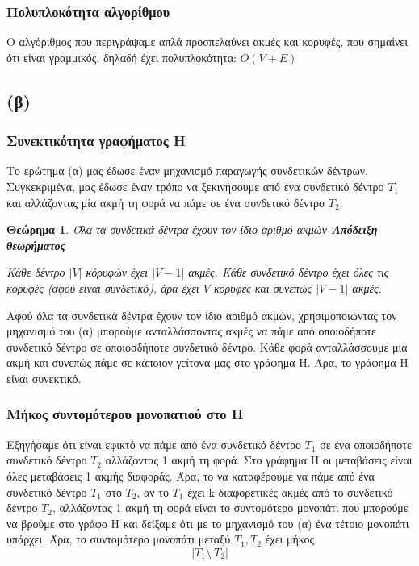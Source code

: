 \documentclass[a4paper,oneside, 11pt]{article}
\newtheorem{theorem}{Θεώρημα}
\begin{document}
\subsubsection{Πολυπλοκότητα αλγορίθμου}
Ο αλγόριθμος που περιγράψαμε απλά προσπελαύνει ακμές και κορυφές, που σημαίνει ότι είναι γραμμικός, δηλαδή έχει πολυπλοκότητα: $O(V+E)$

\subsection{(β)}
\subsubsection{Συνεκτικότητα γραφήματος H}
Το ερώτημα (α) μας έδωσε έναν μηχανισμό παραγωγής συνδετικών δέντρων. Συγκεκριμένα, μας έδωσε έναν τρόπο να ξεκινήσουμε από ένα συνδετικό δέντρο $T_1$ και αλλάζοντας μία ακμή τη φορά να πάμε σε ένα συνδετικό δέντρο $T_2$. \bigbreak 

\begin{theorem}{Όλα τα συνδετικά δέντρα έχουν τον ίδιο αριθμό ακμών}
\bigbreak 
\textbf{Απόδειξη θεωρήματος} \par 
Κάθε δέντρο $|V|$ κόρυφών έχει $|V-1|$ ακμές. Κάθε συνδετικό δέντρο έχει όλες τις κορυφές (αφού είναι συνδετικό), άρα έχει $V$ κορυφές και συνεπώς $|V-1|$ ακμές.
\end{theorem}

Αφού όλα τα συνδετικά δέντρα έχουν τον ίδιο αριθμό ακμών, χρησιμοποιώντας τον μηχανισμό του (α) μπορούμε ανταλλάσσοντας ακμές να πάμε από οποιοδήποτε συνδετικό δέντρο σε οποιοσδήποτε συνδετικό δέντρο. Κάθε φορά ανταλλάσσουμε μια ακμή και συνεπώς πάμε σε κάποιον γείτονα μας στο γράφημα H. Άρα, το γράφημα H είναι συνεκτικό.

\subsubsection{Μήκος συντομότερου μονοπατιού στο H}
Εξηγήσαμε ότι είναι εφικτό να πάμε από ένα συνδετικό δέντρο $T_1$ σε ένα οποιοδήποτε συνδετικό δέντρο $T_2$ αλλάζοντας 1 ακμή τη φορά. Στο γράφημα H οι μεταβάσεις είναι όλες μεταβάσεις 1 ακμής διαφοράς. Άρα, το να καταφέρουμε να πάμε από ένα συνδετικό δέντρο $T_1$ στο $T_2$, αν το $T_1$ έχει k διαφορετικές ακμές από το συνδετικό δέντρο $T_2$, αλλάζοντας 1 ακμή τη φορά είναι το συντομότερο μονοπάτι που μπορούμε να βρούμε στο γράφο H και δείξαμε ότι με το μηχανισμό του (α) ένα τέτοιο μονοπάτι υπάρχει. Άρα, το συντομότερο μονοπάτι μεταξύ $T_1, T_2$ έχει μήκος:
$$ |T_1 \textrm{\textbackslash } \  T_2|$$
\end{document}
